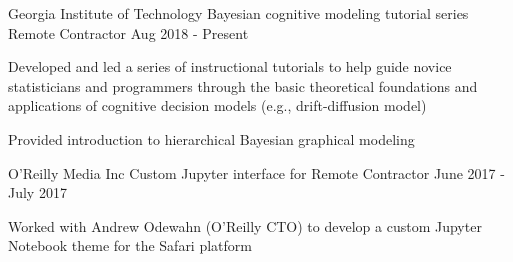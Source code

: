 \begin{cventries}
  \cventry
    {Georgia Institute of Technology} %
    {Bayesian cognitive modeling tutorial series} %
    {Remote Contractor} %
    {Aug 2018 - Present} %
    {
      \begin{cvitems} 
        \item{Developed and led a series of instructional tutorials to help guide novice statisticians and programmers through the basic theoretical foundations and applications of cognitive decision models (e.g., drift-diffusion model)}
        \item{Provided introduction to hierarchical Bayesian graphical modeling}
      \end{cvitems}
    }
    \vspace*{0.2cm}
    
    
  \cventry
    {O'Reilly Media Inc} %
    {Custom Jupyter interface for }
    {Remote Contractor} %
    {June 2017 - July 2017} %
    {
      \begin{cvitems} 
        \item {Worked with Andrew Odewahn (O'Reilly CTO) to develop a custom Jupyter Notebook theme for the Safari platform}
      \end{cvitems}
    }


\end{cventries}
